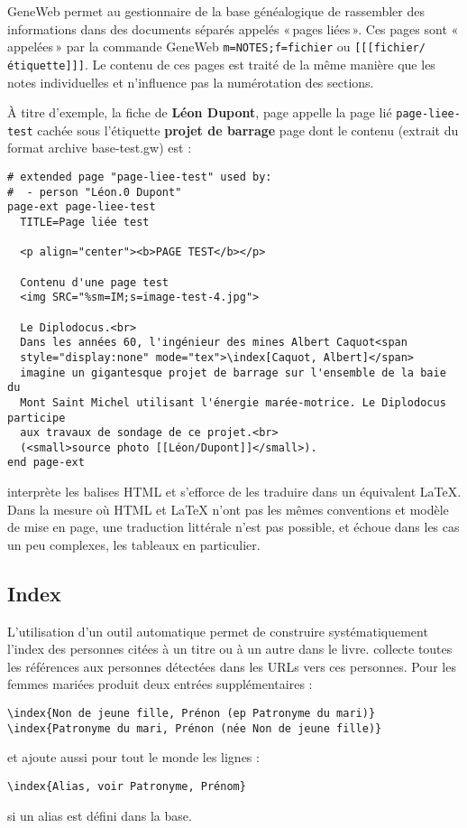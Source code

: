 \begin{description}[style=nextline]
\item[Pages liées] GeneWeb permet au gestionnaire de la base généalogique
de rassembler des informations dans des documents séparés appelés «\,pages liées\,».
Ces pages sont «\,appelées\,» par la commande GeneWeb \verb|m=NOTES;f=fichier| ou
\verb|[[[fichier/étiquette]]]|. Le contenu de ces pages est traité de la même
manière que les notes individuelles et n'influence pas la numérotation
des sections.

À titre d'exemple, la fiche de
{\bf Léon Dupont}, page \pageref{leondupont} appelle la page lié
\verb|page-liee-test| cachée sous l'étiquette {\bf projet de barrage}
page \pageref{pageliee} dont le contenu (extrait du format archive
base-test.gw) est :

\begin{verbatim}
# extended page "page-liee-test" used by:
#  - person "Léon.0 Dupont"
page-ext page-liee-test
  TITLE=Page liée test
  
  <p align="center"><b>PAGE TEST</b></p>
  
  Contenu d'une page test
  <img SRC="%sm=IM;s=image-test-4.jpg">
  
  Le Diplodocus.<br>
  Dans les années 60, l'ingénieur des mines Albert Caquot<span
  style="display:none" mode="tex">\index[Caquot, Albert]</span>
  imagine un gigantesque projet de barrage sur l'ensemble de la baie du
  Mont Saint Michel utilisant l'énergie marée-motrice. Le Diplodocus participe
  aux travaux de sondage de ce projet.<br>
  (<small>source photo [[Léon/Dupont]]</small>).
end page-ext
\end{verbatim}

\item[Autres pages] \gwtol{} interprète les balises HTML et s'efforce de
les traduire dans un équivalent \LaTeX{}. Dans la mesure où HTML et \LaTeX{}
n'ont pas les mêmes conventions et modèle de mise en page, une traduction
littérale n'est pas possible, et échoue dans les cas un peu complexes,
les tableaux en particulier.

\end{description}

\subsection{Index}

L'utilisation d'un outil automatique permet de construire systématiquement
l'index des personnes citées à un titre ou à un autre dans le livre.
\gwtol{} collecte toutes les références aux personnes
détectées dans les URLs vers ces personnes. Pour les femmes mariées
\gwtol{} produit deux entrées supplémentaires :
\begin{verbatim}
\index{Non de jeune fille, Prénon (ep Patronyme du mari)}
\index{Patronyme du mari, Prénon (née Non de jeune fille)}
\end{verbatim}
et ajoute aussi pour tout le monde les lignes :
\begin{verbatim}
\index{Alias, voir Patronyme, Prénom}
\end{verbatim}
si un alias est défini dans la base.

